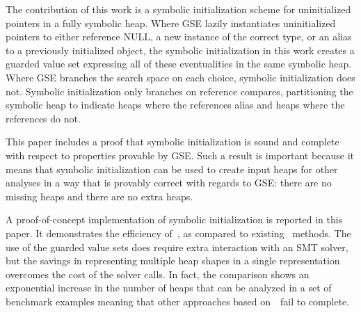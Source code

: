 The contribution of this work is a symbolic initialization scheme for uninitialized pointers in a fully symbolic heap. Where GSE lazily instantiates uninitialized pointers to either reference NULL, a new instance of the correct type, or an alias to a previously initialized object, the symbolic initialization in this work creates a guarded value set expressing all of these eventualities in the same symbolic heap. Where GSE branches the search space on each choice, symbolic initialization does not. Symbolic initialization only branches on reference compares, partitioning the symbolic heap to indicate heaps where the references alias and heaps where the references do not.

This paper includes a proof that symbolic initialization is sound and complete with respect to properties provable by GSE. Such a result is important because it means that symbolic initialization can be used to create input heaps for other analyses in a way that is provably correct with regards to GSE: there are no missing heaps and there are no extra heaps. 

A proof-of-concept implementation of symbolic initialization is reported in this paper. It demonstrates the efficiency of~\symtxt{}, as compared to existing~\gsetxt{} methods. The use of the guarded value sets does require extra interaction with an SMT solver, but the savings in representing multiple heap shapes in a single representation overcomes the cost of the solver calls. In fact, the comparison shows an exponential increase in the number of heaps that can be analyzed in a set of benchmark examples meaning that other approaches based on~\gsetxt\ fail to complete.

